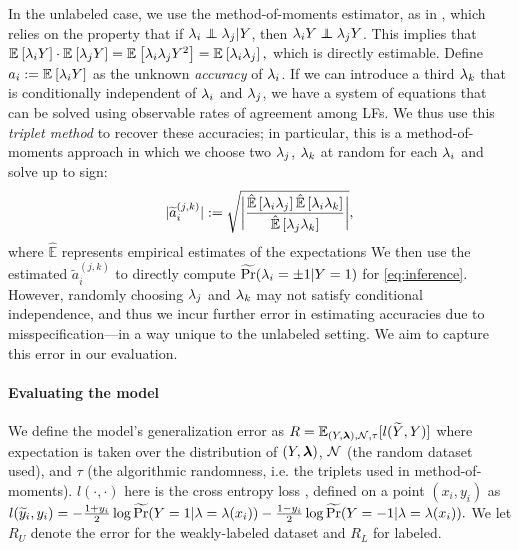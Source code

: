 In the unlabeled case, we use the method-of-moments estimator, as in \cite{fu2020fast}, which relies on the property
that if $\lf_i \independent \lf_j | Y$, then $\lf_i Y \independent \lf_j Y$.
%
This implies that $\mathbb{E}_{}\left[\lambda_i Y\right] \cdot \mathbb{E}_{}\left[\lambda_j Y\right] = \mathbb{E}_{}\left[\lambda_i \lambda_j Y^2\right] = \mathbb{E}_{}\left[\lambda_i \lambda_j\right],$ which is directly estimable.
Define $a_i := \mathbb{E}_{}\left[\lambda_i Y\right]$ as the unknown \textit{accuracy} of $\lambda_i$. If we can introduce a third $\lambda_k$ that is conditionally independent of $\lambda_i$ and $\lambda_j$, we have a system of equations that can be solved using observable rates of agreement among LFs. We thus use this \textit{triplet method} to recover these accuracies; in particular, this is a method-of-moments approach in which we choose two $\lambda_j$, $\lambda_k$ at random for each $\lambda_i$ and solve up to sign:
\begin{align}
    |\widetilde{a}_i^{(j, k)}| := \sqrt{\bigg| \frac{\hat{\mathbb{E}}\left[\lambda_i \lambda_j\right] \hat{\mathbb{E}}\left[\lambda_i \lambda_k\right]}{\hat{\mathbb{E}}\left[\lambda_j \lambda_k\right]} \bigg|},
    \label{eq:triplet}
\end{align}
where $\hat{\mathbb{E}}$ represents empirical estimates of the expectations %
We then use the estimated $\widetilde{a}_i^{(j, k)}$ to directly compute $\widetilde{\Pr}(\lambda_i = \pm 1 | Y = 1)$ for \eqref{eq:inference}. However, randomly choosing $\lambda_j$ and $\lambda_k$ may not satisfy conditional independence, and thus we incur further error in estimating accuracies due to misspecification---in a way unique to the unlabeled setting. We aim to capture this error in our evaluation. %

\paragraph{Evaluating the model}
We define the model's generalization error as $R = \mathbb{E}_{(Y, \bm{\lambda}), \mathcal{N}, \tau}[l(\widetilde{Y}, Y)]$ where expectation is taken over the distribution of $(Y, \bm{\lambda})$, $\mathcal{N}$ (the random dataset used), and $\tau$ (the algorithmic randomness, i.e. the triplets used in method-of-moments). $l(\cdot, \cdot)$ here is the cross entropy loss 
, defined on a point $(x_i, y_i)$ as
$l(\widetilde{y}_i, y_i) = -\frac{1 + y_i}{2} \log \widetilde{\Pr}(Y = 1 | \lambda = \lambda(x_i))
- \frac{1 - y_i}{2} \log \widetilde{\Pr}(Y = -1 | \lambda = \lambda(x_i)).$
We let $R_U$ denote the error for the weakly-labeled dataset and $R_L$ for labeled.

